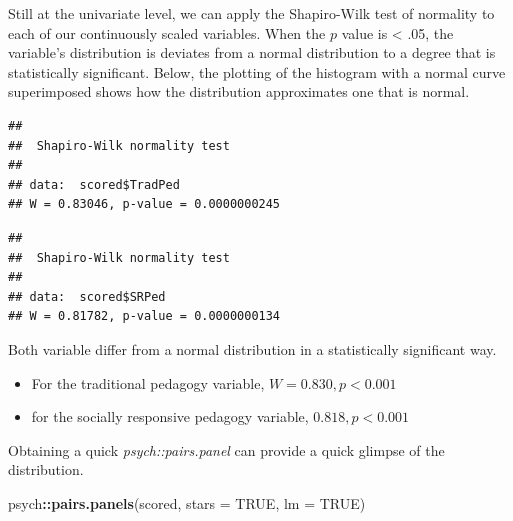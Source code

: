 \documentclass[
  11pt,
]{book}
\newenvironment{Shaded}{\begin{snugshade}}{\end{snugshade}}
\newcommand{\AttributeTok}[1]{\textcolor[rgb]{0.27,0.27,0.27}{#1}}
\newcommand{\CommentTok}[1]{\textcolor[rgb]{0.37,0.37,0.37}{\textit{#1}}}
\newcommand{\ConstantTok}[1]{\textcolor[rgb]{0.37,0.37,0.37}{#1}}
\newcommand{\FunctionTok}[1]{\textcolor[rgb]{0.27,0.27,0.27}{\textbf{#1}}}
\newcommand{\NormalTok}[1]{#1}
\newcommand{\SpecialCharTok}[1]{\textcolor[rgb]{0.43,0.43,0.43}{\textbf{#1}}}
\providecommand{\tightlist}{%
  \setlength{\itemsep}{0pt}\setlength{\parskip}{0pt}}
\begin{document}
Still at the univariate level, we can apply the Shapiro-Wilk test of normality to each of our continuously scaled variables. When the \(p\) value is \textless{} .05, the variable's distribution is deviates from a normal distribution to a degree that is statistically significant. Below, the plotting of the histogram with a normal curve superimposed shows how the distribution approximates one that is normal.

\begin{Shaded}
\end{Shaded}

\begin{verbatim}
## 
##  Shapiro-Wilk normality test
## 
## data:  scored$TradPed
## W = 0.83046, p-value = 0.0000000245
\end{verbatim}

\begin{Shaded}
\end{Shaded}

\begin{verbatim}
## 
##  Shapiro-Wilk normality test
## 
## data:  scored$SRPed
## W = 0.81782, p-value = 0.0000000134
\end{verbatim}

Both variable differ from a normal distribution in a statistically significant way.

\begin{itemize}
\tightlist
\item
  For the traditional pedagogy variable, \(W = 0.830, p < 0.001\)
\item
  for the socially responsive pedagogy variable, \(0.818, p < 0.001\)
\end{itemize}

Obtaining a quick \emph{psych::pairs.panel} can provide a quick glimpse of the distribution.

\begin{Shaded}
\begin{Highlighting}[]
\NormalTok{psych}\SpecialCharTok{::}\FunctionTok{pairs.panels}\NormalTok{(scored, }\AttributeTok{stars =} \ConstantTok{TRUE}\NormalTok{, }\AttributeTok{lm =} \ConstantTok{TRUE}\NormalTok{)}
\end{Highlighting}
\end{Shaded}
\end{document}
